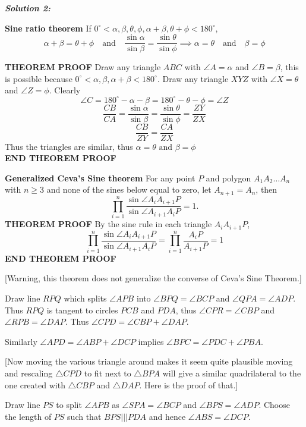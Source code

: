 \documentclass[12pt]{article}
\newcommand{\solnum}[1]{\textbf{\textit{Solution #1: }}}
\begin{document}
\begin{enumerate}[topsep=\bigskipamount,itemsep=\bigskipamount,leftmargin=0pt]
\solnum{2}

\textbf{Sine ratio theorem}
If $0^\circ<\alpha,\beta,\theta,\phi,\alpha+\beta,\theta+\phi<180^\circ$,
$$\alpha+\beta = \theta+\phi \quad\text{and}\quad \dfrac{\sin \alpha}{\sin \beta} = \dfrac{\sin \theta}{\sin \phi}
\implies \alpha=\theta \quad\text{and}\quad \beta=\phi$$

\textbf{THEOREM PROOF}
Draw any triangle $ABC$ with $\angle A=\alpha$ and $\angle B = \beta$, this is possible because $0^\circ<\alpha,\beta,\alpha+\beta<180^\circ$.
Draw any triangle $XYZ$ with $\angle X=\theta$ and $\angle Z = \phi$.
Clearly 
$$\angle C = 180^\circ-\alpha-\beta=180^\circ-\theta-\phi = \angle Z$$
$$\dfrac{CB}{CA} = \dfrac{\sin\alpha}{\sin\beta}=\dfrac{\sin \theta}{\sin \phi}=\dfrac{ZY}{ZX}$$
$$\dfrac{CB}{ZY} =\dfrac{CA}{ZX}$$
Thus the triangles are similar,
thus $\alpha=\theta \text{ and } \beta=\phi$ \\
\textbf{END THEOREM PROOF}

\textbf{Generalized Ceva's Sine theorem}
For any point $P$ and polygon $A_1 A_2 \dots A_n$ with $n\geq 3$ and none of the sines below equal to zero, let $A_{n+1} = A_n$, then
$$\prod_{i=1}^n \dfrac{\sin \angle A_{i}A_{i+1}P}{\sin \angle A_{i+1}A_{i}P} = 1.$$
\textbf{THEOREM PROOF}
By the sine rule in each triangle $A_iA_{i+1}P$,
$$\prod_{i=1}^n \dfrac{\sin \angle A_{i}A_{i+1}P}{\sin \angle A_{i+1}A_{i}P}
=\prod_{i=1}^n \dfrac{A_{i}P}{ A_{i+1}P} =1$$
\textbf{END THEOREM PROOF}

[Warning, this theorem does not generalize the converse of Ceva's Sine Theorem.]

Draw line $RPQ$ which splits $\angle APB$ into $\angle BPQ = \angle BCP$ and $\angle QPA = \angle ADP$.
Thus $RPQ$ is tangent to circles $PCB$ and $PDA$, thus $\angle CPR = \angle CBP$ and $\angle RPB = \angle DAP$.
Thus $\angle CPD = \angle CBP + \angle DAP$.

Similarly $\angle APD=\angle ABP+\angle DCP$
implies $\angle BPC=\angle PDC+\angle PBA$.

[Now moving the various triangle around makes it seem quite plausible 
moving and rescaling $\triangle CPD$ to fit next to $\triangle BPA$ will give a similar quadrilateral to the one created with $\triangle CBP$ and $\triangle DAP$.
Here is the proof of that.]

Draw line $PS$ to split $\angle APB$ as $\angle SPA = \angle BCP$ 
and $\angle BPS = \angle ADP$.
Choose the length of $PS$ such that $BPS ||| PDA$ and hence $\angle ABS = \angle DCP$.


\end{enumerate}
\end{document}

